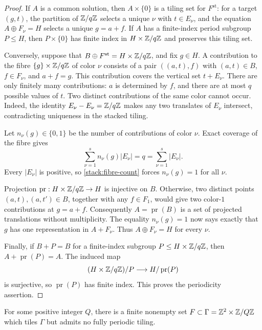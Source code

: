 \begin{proof}
If $A$ is a common solution, then $A\times\{0\}$ is a tiling set for
$F^{\mathrm{st}}$: for a target $(g,t)$, the partition of $\mathbb Z/q\mathbb Z$
selects a unique $\nu$ with $t\in E_\nu$, and the equation
$A\oplus F_\nu=H$ selects a unique $g=a+f$.  If $A$ has a finite-index
period subgroup $P\leq H$, then $P\times\{0\}$ has finite index in
$H\times\mathbb Z/q\mathbb Z$ and preserves this tiling set.

Conversely, suppose that $B\oplus F^{\mathrm{st}}=H\times\mathbb Z/q\mathbb Z$,
and fix $g\in H$.  A contribution to the fibre $\{g\}\times\mathbb Z/q\mathbb Z$
of color $\nu$ consists of a pair $((a,t),f)$ with $(a,t)\in B$,
$f\in F_\nu$, and $a+f=g$.  This contribution covers the vertical
set $t+E_\nu$.  There are only finitely many contributions: $a$ is
determined by $f$, and there are at most $q$ possible values of $t$.
Two distinct contributions of the same color cannot occur.  Indeed,
the identity $E_\nu-E_\nu=\mathbb Z/q\mathbb Z$ makes any two translates of
$E_\nu$ intersect, contradicting uniqueness in the stacked tiling.

Let $n_\nu(g)\in\{0,1\}$ be the number of contributions of color
$\nu$.  Exact coverage of the fibre gives
\begin{equation}
 \sum_{\nu=1}^s n_\nu(g)|E_\nu|
   =q=\sum_{\nu=1}^s|E_\nu|.
 \label{stack:fibre-count}
\end{equation}
Every $|E_\nu|$ is positive, so \cref{stack:fibre-count} forces
$n_\nu(g)=1$ for all $\nu$.

Projection $\operatorname{pr}:H\times\mathbb Z/q\mathbb Z\to H$ is injective on
$B$.  Otherwise, two distinct points $(a,t),(a,t')\in B$, together
with any $f\in F_1$, would give two color-$1$ contributions at $g=a+f$.
Consequently $A=\operatorname{pr}(B)$ is a set of projected
translations without multiplicity.  The equality $n_\nu(g)=1$ now
says exactly that $g$ has one representation in $A+F_\nu$.  Thus
$A\oplus F_\nu=H$ for every $\nu$.

Finally, if $B+P=B$ for a finite-index subgroup
$P\leq H\times\mathbb Z/q\mathbb Z$, then
$A+\operatorname{pr}(P)=A$.  The induced map
\[
 (H\times\mathbb Z/q\mathbb Z)/P\longrightarrow H/\operatorname{pr}(P)
\]
is surjective, so $\operatorname{pr}(P)$ has finite index.  This proves
the periodicity assertion.
\end{proof}

\begin{corollary}
\label{stack:cyclic}
For some positive integer $Q$, there is a finite nonempty set
$F\subset\Gamma=\mathbb Z^2\times\mathbb Z/Q\mathbb Z$ which tiles $\Gamma$ but admits
no fully periodic tiling.
\end{corollary}

